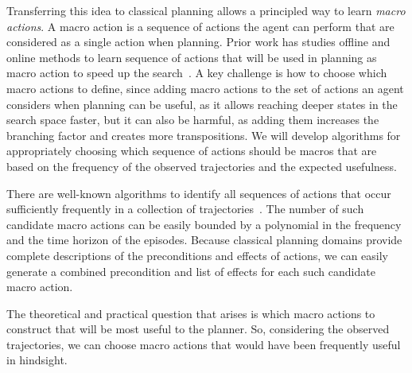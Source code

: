 Transferring this idea to classical planning allows a principled way to learn {\em macro actions}. A macro action is a sequence of actions the agent can perform that are considered as a single action when planning. Prior work has studies offline and online methods to learn sequence of actions that will be used in planning as macro action to speed up the search~\cite{chrpa2014mum,coles2007marvin,chrpa2015online,koedinger1990abstract,korf1985macro}. A key challenge is how to choose which macro actions to define, since adding macro actions to the set of actions an agent considers when planning can be useful, as it allows reaching deeper states in the search space faster, but it can also be harmful, as adding them increases the branching factor and creates more transpositions. We will develop algorithms for appropriately choosing which sequence of actions should be macros that are based on the frequency of the observed trajectories and the expected usefulness.  


There are well-known algorithms to identify all sequences of actions that occur sufficiently frequently in a collection of trajectories~\cite{mannila1997sequences}. The number of such candidate macro actions can be easily bounded by a polynomial in the frequency and the time horizon of the episodes. Because classical planning domains provide complete descriptions of the preconditions and effects of actions, we can easily generate a combined precondition and list of effects for each such candidate macro action.

The theoretical and practical question that arises is which macro actions to construct that will be most useful to the planner. 
So, considering the observed trajectories, we can choose macro actions that would have been frequently useful in hindsight. 

